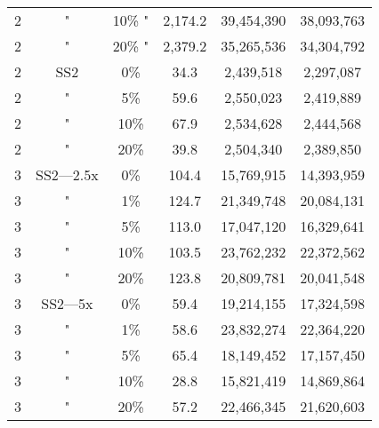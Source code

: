 \begin{table}[htdp]
\begin{center}
\begin{tabular}{|c|c|c|c|c|c|}
2 & " & 10\% " & 2,174.2  & 39,454,390 &38,093,763 \\
2 & " & 20\% " & 2,379.2  & 35,265,536 &34,304,792 \\
2 & SS2 & 0\% & 34.3  & 2,439,518 &2,297,087 \\
2 & " & 5\% & 59.6  & 2,550,023 &2,419,889 \\
2 & " & 10\% & 67.9  & 2,534,628 &2,444,568 \\
2 & " & 20\% & 39.8  & 2,504,340 &2,389,850 \\
3 & SS2---2.5x & 0\% & 104.4  & 15,769,915 &14,393,959 \\
3 & " & 1\% & 124.7  & 21,349,748 &20,084,131 \\
3 & " & 5\% & 113.0  & 17,047,120 &16,329,641 \\
3 & " & 10\% & 103.5  & 23,762,232 &22,372,562 \\
3 & " & 20\% & 123.8  & 20,809,781 &20,041,548 \\
3 & SS2---5x & 0\% & 59.4  & 19,214,155 &17,324,598 \\
3 & " & 1\% & 58.6  & 23,832,274 &22,364,220 \\
3 & " & 5\% & 65.4  & 18,149,452 &17,157,450 \\
3 & " & 10\% & 28.8  & 15,821,419 &14,869,864 \\
3 & " & 20\% & 57.2  & 22,466,345 &21,620,603 \\
\hline

\end{tabular}
\label{tab:protocols}
\end{center}
\end{table}
      